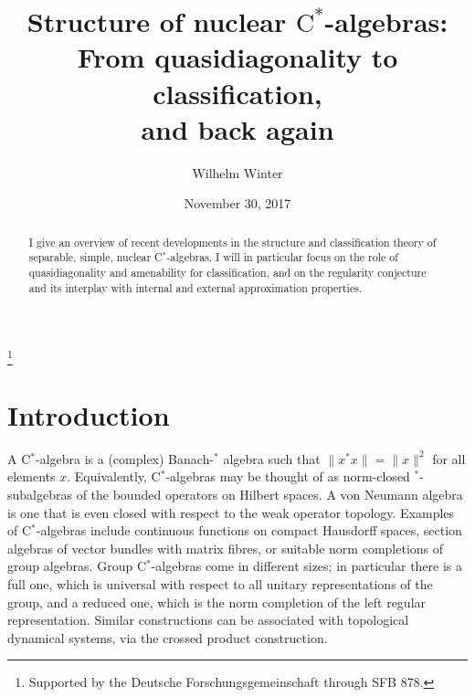 \documentclass{amsart}
\begin{document}
\title[Nuclear $\mathrm{C}^{*}$-algebras]{{\sc Structure of nuclear $\mathrm{C}^{*}$-algebras:\\From quasidiagonality to classification,\\and back again}}




\author{Wilhelm Winter}
\address{Mathematisches Institut\\
WWU M\"unster\\ Germany}



\date{November 30, 2017}
\thanks{Supported by the Deutsche Forschungsgemeinschaft through SFB 878.}














\begin{abstract}
I give an overview of recent developments in the structure and classification theory of separable, simple, nuclear C$^*$-algebras. I will in particular focus on the role of quasidiagonality and amenability for classification, and on the regularity conjecture and its interplay with internal and external approximation properties. 
\end{abstract}

\maketitle



\section*{Introduction}



\noindent
A C$^*$-algebra is a (complex) Banach-$^*$ algebra such that $\|x^*x\| = \|x\|^2$ for all elements $x$. Equivalently, C$^*$-algebras may be thought of as norm-closed $^*$-subalgebras of the bounded operators on Hilbert spaces. A von Neumann algebra is one that is even closed with respect to the weak operator topology. Examples of C$^*$-algebras include continuous functions on compact Hausdorff spaces, section algebras of vector bundles with matrix fibres, or suitable norm completions of group algebras. Group C$^*$-algebras come in different sizes; in particular there is a full one, which is universal with respect to all unitary representations of the group, and a reduced one, which is the norm completion of the left regular representation. Similar constructions can be associated with topological dynamical systems, via the crossed product construction.  
\end{document}
